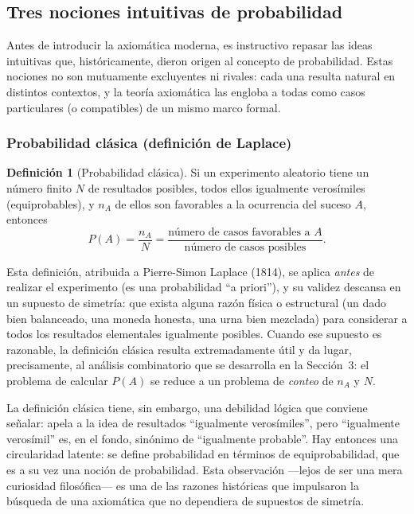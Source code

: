 \documentclass[11pt,a4paper]{article}
\theoremstyle{plain}
\theoremstyle{definition}
\newtheorem{definicion}[teorema]{Definición}
\theoremstyle{remark}
\begin{document}
\subsection{Tres nociones intuitivas de probabilidad}

Antes de introducir la axiomática moderna, es instructivo repasar las ideas intuitivas que, históricamente, dieron origen al concepto de probabilidad. Estas nociones no son mutuamente excluyentes ni rivales: cada una resulta natural en distintos contextos, y la teoría axiomática las engloba a todas como casos particulares (o compatibles) de un mismo marco formal.

\subsubsection{Probabilidad clásica (definición de Laplace)}

\begin{definicion}[Probabilidad clásica]
Si un experimento aleatorio tiene un número finito $N$ de resultados posibles, todos ellos igualmente verosímiles (equiprobables), y $n_A$ de ellos son favorables a la ocurrencia del suceso $A$, entonces
\[
P(A) = \frac{n_A}{N} = \frac{\text{número de casos favorables a } A}{\text{número de casos posibles}}.
\]
\end{definicion}

Esta definición, atribuida a Pierre-Simon Laplace (1814), se aplica \emph{antes} de realizar el experimento (es una probabilidad ``a priori''), y su validez descansa en un supuesto de simetría: que exista alguna razón física o estructural (un dado bien balanceado, una moneda honesta, una urna bien mezclada) para considerar a todos los resultados elementales igualmente posibles. Cuando ese supuesto es razonable, la definición clásica resulta extremadamente útil y da lugar, precisamente, al análisis combinatorio que se desarrolla en la Sección~3: el problema de calcular $P(A)$ se reduce a un problema de \emph{conteo} de $n_A$ y $N$.

La definición clásica tiene, sin embargo, una debilidad lógica que conviene señalar: apela a la idea de resultados ``igualmente verosímiles'', pero ``igualmente verosímil'' es, en el fondo, sinónimo de ``igualmente probable''. Hay entonces una circularidad latente: se define probabilidad en términos de equiprobabilidad, que es a su vez una noción de probabilidad. Esta observación —lejos de ser una mera curiosidad filosófica— es una de las razones históricas que impulsaron la búsqueda de una axiomática que no dependiera de supuestos de simetría.
\end{document}
